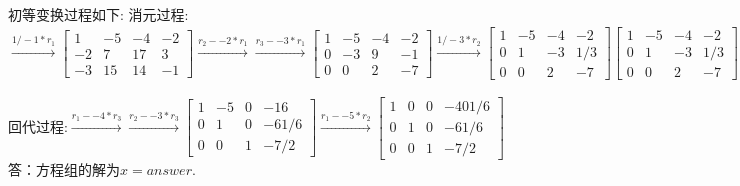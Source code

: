 \documentclass[12pt,a4paper]{ctexart}%
\begin{document}
\begin{enumerate}[1)]
\begin{solve}%
初等变换过程如下:
消元过程:$\xrightarrow{1/-1 * r_1}\begin{bmatrix}
1 & -5 & -4 & -2\\
-2 & 7 & 17 & 3\\
-3 & 15 & 14 & -1
\end{bmatrix}\xrightarrow{r_2 --2*r_1}\xrightarrow{r_3 --3*r_1}\begin{bmatrix}
1 & -5 & -4 & -2\\
0 & -3 & 9 & -1\\
0 & 0 & 2 & -7
\end{bmatrix}\xrightarrow{1/-3 * r_2}\begin{bmatrix}
1 & -5 & -4 & -2\\
0 & 1 & -3 & 1/3\\
0 & 0 & 2 & -7
\end{bmatrix}\begin{bmatrix}
1 & -5 & -4 & -2\\
0 & 1 & -3 & 1/3\\
0 & 0 & 2 & -7
\end{bmatrix}\xrightarrow{1/2 * r_3}\begin{bmatrix}
1 & -5 & -4 & -2\\
0 & 1 & -3 & 1/3\\
0 & 0 & 1 & -7/2
\end{bmatrix}$

回代过程:$\xrightarrow{r_1 - -4*r_3}\xrightarrow{r_2 - -3*r_3}\begin{bmatrix}
1 & -5 & 0 & -16\\
0 & 1 & 0 & -61/6\\
0 & 0 & 1 & -7/2
\end{bmatrix}\xrightarrow{r_1 - -5*r_2}\begin{bmatrix}
1 & 0 & 0 & -401/6\\
0 & 1 & 0 & -61/6\\
0 & 0 & 1 & -7/2
\end{bmatrix}$答：方程组的解为$x = {{answer}}$.%
\end{solve}%
\end{enumerate}%
\end{document}
